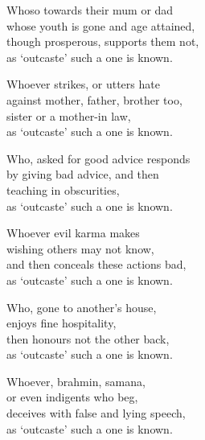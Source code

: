 \begin{MyDescription}{}
Whoso towards their mum or dad\\
whose youth is gone and age attained,\\
though prosperous, supports them not,\\
as `outcaste' such a one is known.
\end{MyDescription}   

\begin{MyDescription}{}
Whoever strikes, or utters hate\\
against mother, father, brother too,\\
sister or a mother-in law,\\
as `outcaste' such a one is known.
\end{MyDescription}   

\begin{MyDescription}{}
Who, asked for good advice responds\\
by giving bad advice, and then\\
teaching in obscurities,\\
as `outcaste' such a one is known.
\end{MyDescription}   
   
\begin{MyDescription}{}
Whoever evil karma makes\\
wishing others may not know,\\
and then conceals these actions bad,\\
as `outcaste' such a one is known.
\end{MyDescription}   

\begin{MyDescription}{}
Who, gone to another's house,\\
enjoys fine hospitality,\\
then honours not the other back,\\
as `outcaste' such a one is known.
\end{MyDescription}   

\begin{MyDescription}{}
Whoever, brahmin, samana,\\
or even indigents who beg,\\
deceives with false and lying speech,\\
as `outcaste' such a one is known.
\end{MyDescription}   

